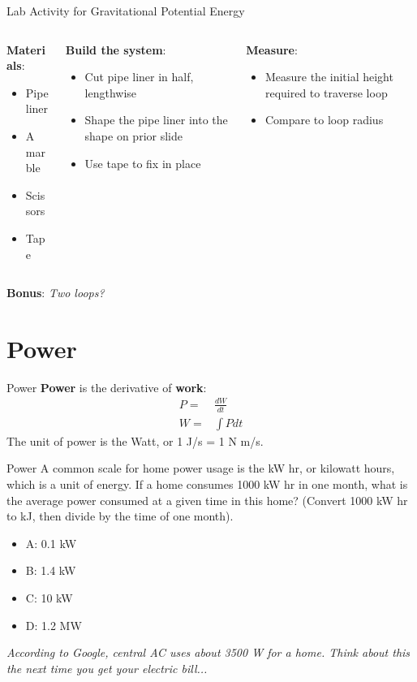 \documentclass{beamer}
\begin{document}
\begin{frame}{Lab Activity for Gravitational Potential Energy}
\begin{columns}[T]
\begin{column}{0.33\textwidth}
\textbf{Materials}:
\begin{itemize}
\item Pipe liner
\item A marble
\item Scissors
\item Tape
\end{itemize}
\end{column}
\begin{column}{0.33\textwidth}
\textbf{Build the system}:
\begin{itemize}
\item Cut pipe liner in half, lengthwise
\item Shape the pipe liner into the shape on prior slide
\item Use tape to fix in place
\end{itemize}
\end{column}
\begin{column}{0.33\textwidth}
\textbf{Measure}:
\begin{itemize}
\item Measure the initial height required to traverse loop
\item Compare to loop radius
\end{itemize}
\end{column}
\end{columns}
\alert{\textbf{Bonus}: \textit{Two loops?}}
\end{frame}

\section{Power}

\begin{frame}{Power}
\textbf{Power} is the derivative of \textbf{work}:
\begin{align}
P =& \frac{dW}{dt} \\
W =& \int P dt
\end{align}
The unit of power is the Watt, or 1 J/s = 1 N m/s.
\end{frame}

\begin{frame}{Power}
A common scale for home power usage is the kW hr, or kilowatt hours, which is a unit of energy.  If a home consumes 1000 kW hr in one month, what is the average power consumed at a given time in this home?  (Convert 1000 kW hr to kJ, then divide by the time of one month).
\begin{itemize}
\item A: 0.1 kW
\item B: 1.4 kW
\item C: 10 kW
\item D: 1.2 MW
\end{itemize}
\textit{According to Google, central AC uses about 3500 W for a home.  Think about this the next time you get your electric bill...}
\end{frame}
\end{document}
